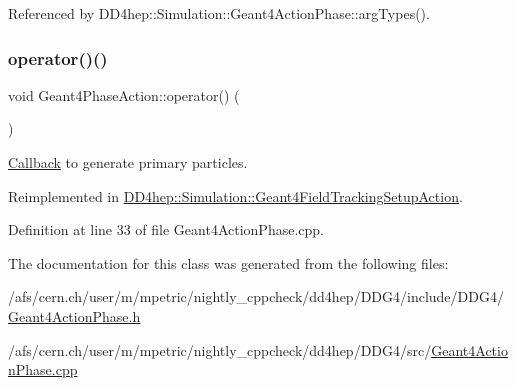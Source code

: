 Referenced by D\+D4hep\+::\+Simulation\+::\+Geant4\+Action\+Phase\+::arg\+Types().

\hypertarget{class_d_d4hep_1_1_simulation_1_1_geant4_phase_action_a5d8bac662ec707a8cdff0bd3cdd9b831}{}\label{class_d_d4hep_1_1_simulation_1_1_geant4_phase_action_a5d8bac662ec707a8cdff0bd3cdd9b831} 
\subsubsection{\texorpdfstring{operator()()}{operator()()}}
{\footnotesize\ttfamily void Geant4\+Phase\+Action\+::operator() (\begin{DoxyParamCaption}{ }\end{DoxyParamCaption})\hspace{0.3cm}{\ttfamily [virtual]}}



\hyperlink{class_d_d4hep_1_1_callback}{Callback} to generate primary particles. 



Reimplemented in \hyperlink{class_d_d4hep_1_1_simulation_1_1_geant4_field_tracking_setup_action_a5412b262d35a196e35807b2a3fe2463b}{D\+D4hep\+::\+Simulation\+::\+Geant4\+Field\+Tracking\+Setup\+Action}.



Definition at line 33 of file Geant4\+Action\+Phase.\+cpp.



The documentation for this class was generated from the following files\+:\begin{DoxyCompactItemize}
\item 
/afs/cern.\+ch/user/m/mpetric/nightly\+\_\+cppcheck/dd4hep/\+D\+D\+G4/include/\+D\+D\+G4/\hyperlink{_geant4_action_phase_8h}{Geant4\+Action\+Phase.\+h}\item 
/afs/cern.\+ch/user/m/mpetric/nightly\+\_\+cppcheck/dd4hep/\+D\+D\+G4/src/\hyperlink{_geant4_action_phase_8cpp}{Geant4\+Action\+Phase.\+cpp}\end{DoxyCompactItemize}
